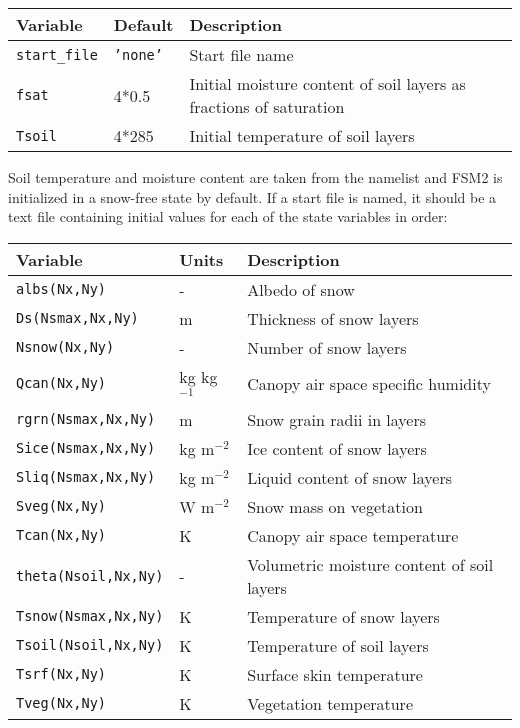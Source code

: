 \documentclass{article}
\begin{document}
\begin{longtable}{|l|l|l|}
\hline
Variable & Default & Description \\
\hline
{\tt start\_file}  & {\tt 'none'}  & Start file name                                      \\
{\tt fsat}  & 4*0.5  & Initial moisture content of soil layers as fractions of saturation \\
{\tt Tsoil} & 4*285  & Initial temperature of soil layers                                 \\

\hline 
\end{longtable}

Soil temperature and moisture content are taken from the namelist and FSM2 is initialized in a snow-free state by default. If a start file is named, it should be a text file containing initial values for each of the state variables in order:

\begin{longtable}{|l|l|l|}
\hline
Variable & Units & Description \\
\hline
{\tt albs(Nx,Ny)}        & -            & Albedo of snow                             \\
{\tt Ds(Nsmax,Nx,Ny)}    & m            & Thickness of snow layers                   \\
{\tt Nsnow(Nx,Ny)}       & -            & Number of snow layers                      \\
{\tt Qcan(Nx,Ny)}        & kg kg$^{-1}$ & Canopy air space specific humidity         \\
{\tt rgrn(Nsmax,Nx,Ny)}  & m            & Snow grain radii in layers                 \\
{\tt Sice(Nsmax,Nx,Ny)}  & kg m$^{-2}$  & Ice content of snow layers                 \\
{\tt Sliq(Nsmax,Nx,Ny)}  & kg m$^{-2}$  & Liquid content of snow layers              \\
{\tt Sveg(Nx,Ny)}        & W m$^{-2}$   & Snow mass on vegetation                    \\
{\tt Tcan(Nx,Ny)}        & K            & Canopy air space temperature               \\
{\tt theta(Nsoil,Nx,Ny)} & -            & Volumetric moisture content of soil layers \\
{\tt Tsnow(Nsmax,Nx,Ny)} & K            & Temperature of snow layers                 \\
{\tt Tsoil(Nsoil,Nx,Ny)} & K            & Temperature of soil layers                 \\
{\tt Tsrf(Nx,Ny)}        & K            & Surface skin temperature                   \\
{\tt Tveg(Nx,Ny)}        & K            & Vegetation temperature                     \\
\hline 
\end{longtable}
\end{document}
